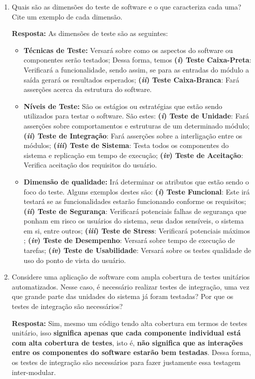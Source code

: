 \documentclass[12pt, a4paper]{article}
\newcommand{\tit}[1]{\textit{#1}}
\newcommand{\tb}[1]{\textbf{#1}}
\newcommand{\bitem}[2]{ \tb{(\tit{#1}) {#2}}}
\newcommand{\sw}{software}
\newcommand{\ssw}{software }
\newcommand{\question}[1]{\item {#1}}
\newcommand{\answer}[1]{\par \tb{Resposta:} #1}
\begin{document}
\begin{enumerate}[label=\textbf{\arabic*.}]
        \question{Quais são as dimensões do teste de software e o que caracteriza cada uma? Cite um exemplo de cada dimensão.}
        \answer{As dimensões de teste são as seguintes:
            \begin{itemize}
                \item \tb{Técnicas de Teste:} Versará sobre como os aspectos do \ssw ou componentes serão testados; Dessa forma, temos \bitem{i}{Teste Caixa-Preta}: Verificará a funcionalidade, sendo assim, se para as entradas do módulo a saída gerará os resultados esperados; \bitem{ii}{Teste Caixa-Branca}: Fará asserções acerca da estrutura do software.
                
                \item \tb{Níveis de Teste:} São os estágios ou estratégias que estão sendo utilizados para testar o \sw. São estes: \bitem{i}{Teste de Unidade}: Fará asserções sobre comportamentos e estruturas de um determinado módulo; \bitem{ii}{Teste de Integração}: Fará asserções sobre a interligação entre os módulos; \bitem{iii}{Teste de Sistema}: Testa todos os componentes do sistema e replicação em tempo de execução; \bitem{iv}{Teste de Aceitação}: Verifica aceitação dos requisitos do usuário.
                           
                \item \tb{Dimensão de qualidade:} Irá determinar os atributos que estão sendo o foco do teste. Alguns exemplos destes são: \bitem{i}{Teste Funcional}: Este irá testará se as funcionalidades estarão funcionando conforme os requisitos; \bitem{ii}{Teste de Segurança}: Verificará potenciais falhas de segurança que ponham em risco os usuários do sistema, seus dados sensíveis, o sistema em si, entre outros; \bitem{iii}{Teste de Stress}: Verificará potenciais máximos ; \bitem{iv}{Teste de Desempenho}: Versará sobre tempo de execução de tarefas; \bitem{iv}{Teste de Usabilidade}: Versará sobre os testes qualidade de uso do ponto de vista do usuário.
            \end{itemize}
        }
        
        \question{Considere uma aplicação de software com ampla cobertura de testes unitários automatizados. Nesse caso, é necessário realizar testes de integração, uma vez que grande parte das unidades do sistema já foram testadas? Por que os testes de integração são necessários?}
        \answer{
           Sim, mesmo um código tendo alta cobertura em termos de testes unitário, isso \tb{significa apenas que cada componente individual está com alta cobertura de testes}, isto é, \tb{não significa que as interações entre os componentes do \ssw estarão bem testadas}. Dessa forma, os testes de integração são necessários para fazer justamente essa testagem inter-modular.
        }


\end{enumerate}
\end{document}
